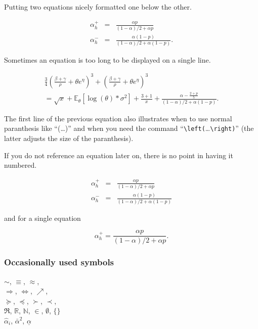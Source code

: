 \documentclass[12pt,a4paper]{article}
\begin{document}
Putting two equations nicely formatted one below the other.

\begin{eqnarray}\label{eq:aplus}
  \alpha^+_h &=&\frac{\alpha p}{(1-\alpha)/2+\alpha p}\\
\alpha^-_h &=&\frac{\alpha (1-p)}{(1-\alpha)/2+\alpha(1-p)}. \label{eq:aminus}
\end{eqnarray}

Sometimes an equation is too long to be displayed on a single line.

\begin{multline}\label{eq:longEq}
\frac{3}{4}\left(\frac{\beta+\gamma}{\rho}+\theta e^\eta\right)^3 + (\frac{\beta+\gamma}{\rho}+\theta e^\eta)^3\\
 =\sqrt{x}+\mathbb{E}_\theta \left[\log(\theta )*\sigma^2 \right]+\frac{3+1}{x}+\frac{\alpha -\frac{2+p}{5}}{(1-\alpha)/2+\alpha(1-p)}. 
\end{multline}

The first line of the previous equation also illustrates when to use normal paranthesis like ``(\dots)'' and when you need the command ``\verb|\left(|\dots\verb|\right)|'' (the latter adjusts the size of the paranthesis).

If you do not reference an equation later on, there is no point in having it numbered.

\begin{eqnarray}\nonumber
  \alpha^+_h &=&\frac{\alpha p}{(1-\alpha)/2+\alpha p}\\
\alpha^-_h &=&\frac{\alpha (1-p)}{(1-\alpha)/2+\alpha(1-p)} \label{eq:aminus}
\end{eqnarray}

and for a single equation 

\begin{equation*}
  \alpha^+_h =\frac{\alpha p}{(1-\alpha)/2+\alpha p}.
\end{equation*}

\subsubsection{Occasionally used symbols}
$\sim$, $\equiv$, $\approx$, \\
$\Rightarrow$, $\Leftrightarrow$, $\nearrow$,\\
$\succeq$, $\preceq$, $\succ$, $\prec$,\\
$\Re$, $\mathbb{R}$, $\mathbb{N}$, $\in$, $\emptyset$, $\{\}$\\
$\hat{\alpha}_i$, $\bar{\alpha}^2$, $\underline{\alpha}$
\end{document}

